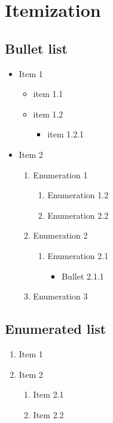 



\section{Itemization}

\subsection{Bullet list}

\begin{itemize}
\item Item 1
\begin{itemize}
\item item 1.1
\item item 1.2
\begin{itemize}
\item item 1.2.1
\end{itemize}
\end{itemize}
\item Item 2
\begin{enumerate}
\item Enumeration 1
\begin{enumerate}
\item Enumeration 1.2
\item Enumeration 2.2
\end{enumerate}
\item Enumeration 2
\begin{enumerate}
\item Enumeration 2.1
\begin{itemize}
\item Bullet 2.1.1
\end{itemize}
\end{enumerate}
\item Enumeration 3
\end{enumerate}
\end{itemize}


\subsection{Enumerated list}

\begin{enumerate}
\item Item 1
\item Item 2
\begin{enumerate}
\item Item 2.1
\item Item 2.2
\end{enumerate}
\end{enumerate}



